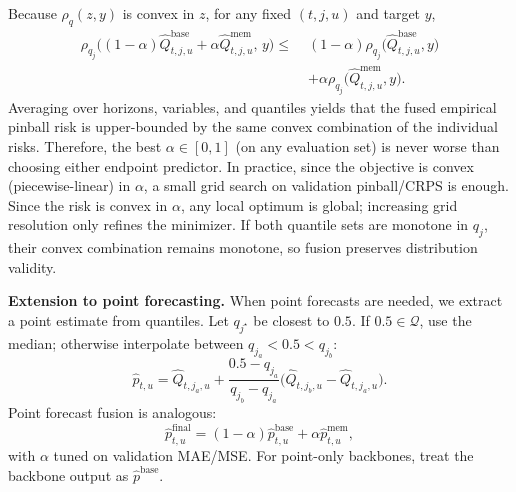 Because $\rho_q(z,y)$ is convex in $z$, for any fixed $(t,j,u)$ and target $y$,
\begin{equation}
\begin{aligned}
\rho_{q_j}\!\Big(
(1-\alpha)\widehat{Q}^{\text{base}}_{t,j,u}
+
\alpha \widehat{Q}^{\text{mem}}_{t,j,u},
\, y
\Big)
\le\;&
(1-\alpha)\rho_{q_j}\!\Big(\widehat{Q}^{\text{base}}_{t,j,u},y\Big) \\
&+
\alpha \rho_{q_j}\!\Big(\widehat{Q}^{\text{mem}}_{t,j,u},y\Big).
\end{aligned}
\end{equation}
Averaging over horizons, variables, and quantiles yields that the fused empirical pinball risk is
upper-bounded by the same convex combination of the individual risks. Therefore, the best $\alpha\in[0,1]$
(on any evaluation set) is never worse than choosing either endpoint predictor. In practice, since the
objective is convex (piecewise-linear) in $\alpha$, a small grid search on validation pinball/CRPS is enough.
Since the risk is convex in $\alpha$, any local optimum is global; increasing grid resolution only refines the minimizer.
If both quantile sets are monotone in $q_j$, their convex combination remains monotone, so fusion preserves
distribution validity.

\noindent\textbf{Extension to point forecasting.}
When point forecasts are needed, we extract a point estimate from quantiles. Let $q_{j^\star}$ be closest to
$0.5$. If $0.5\in\mathcal{Q}$, use the median; otherwise interpolate between $q_{j_a}<0.5<q_{j_b}$:
\begin{equation}
\widehat{p}_{t,u}
=
\widehat{Q}_{t,j_a,u}
+
\frac{0.5-q_{j_a}}{q_{j_b}-q_{j_a}}
\Big(
\widehat{Q}_{t,j_b,u}
-
\widehat{Q}_{t,j_a,u}
\Big).
\end{equation}
Point forecast fusion is analogous:
\begin{equation}
\widehat{p}^{\text{final}}_{t,u}
=
(1-\alpha)\widehat{p}^{\text{base}}_{t,u}
+
\alpha \widehat{p}^{\text{mem}}_{t,u},
\end{equation}
with $\alpha$ tuned on validation MAE/MSE. For point-only backbones, treat the backbone output as
$\widehat{p}^{\text{base}}$.


